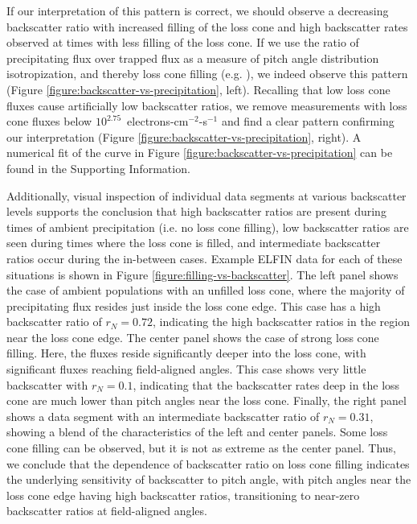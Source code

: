 \documentclass[draft]{agujournal2019}
\begin{document}
If our interpretation of this pattern is correct, we should observe a decreasing backscatter ratio with increased filling of the loss cone and high backscatter rates observed at times with less filling of the loss cone. If we use the ratio of precipitating flux over trapped flux as a measure of pitch angle distribution isotropization, and thereby loss cone filling (e.g. ), we indeed observe this pattern (Figure \ref{figure:backscatter-vs-precipitation}, left). Recalling that low loss cone fluxes cause artificially low backscatter ratios, we remove measurements with loss cone fluxes below $10^{2.75}$~electrons-cm$^{-2}$-s$^{-1}$ and find a clear pattern confirming our interpretation (Figure \ref{figure:backscatter-vs-precipitation}, right). A numerical fit of the curve in Figure \ref{figure:backscatter-vs-precipitation} can be found in the Supporting Information.

Additionally, visual inspection of individual data segments at various backscatter levels supports the conclusion that high backscatter ratios are present during times of ambient precipitation (i.e. no loss cone filling), low backscatter ratios are seen during times where the loss cone is filled, and intermediate backscatter ratios occur during the in-between cases. Example ELFIN data for each of these situations is shown in Figure \ref{figure:filling-vs-backscatter}. The left panel shows the case of ambient populations with an unfilled loss cone, where the majority of precipitating flux resides just inside the loss cone edge. This case has a high backscatter ratio of $r_N = 0.72$, indicating the high backscatter ratios in the region near the loss cone edge. The center panel shows the case of strong loss cone filling. Here, the fluxes reside significantly deeper into the loss cone, with significant fluxes reaching field-aligned angles. This case shows very little backscatter with $r_N = 0.1$, indicating that the backscatter rates deep in the loss cone are much lower than pitch angles near the loss cone. Finally, the right panel shows a data segment with an intermediate backscatter ratio of $r_N = 0.31$, showing a blend of the characteristics of the left and center panels. Some loss cone filling can be observed, but it is not as extreme as the center panel. Thus, we conclude that the dependence of backscatter ratio on loss cone filling indicates the underlying sensitivity of backscatter to pitch angle, with pitch angles near the loss cone edge having high backscatter ratios, transitioning to near-zero backscatter ratios at field-aligned angles.
\end{document}
